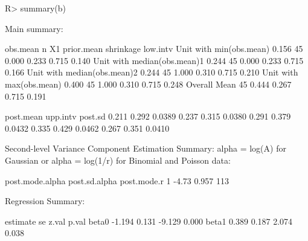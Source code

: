 \documentclass[article]{jss}
\begin{document}

\begin{CodeChunk}
\begin{CodeInput}
R> summary(b)
\end{CodeInput}
\begin{CodeOutput}
Main summary:

                            obs.mean  n    X1 prior.mean shrinkage low.intv 
Unit with min(obs.mean)        0.156 45 0.000      0.233     0.715    0.140     
Unit with median(obs.mean)1    0.244 45 0.000      0.233     0.715    0.166     
Unit with median(obs.mean)2    0.244 45 1.000      0.310     0.715    0.210     
Unit with max(obs.mean)        0.400 45 1.000      0.310     0.715    0.248     
Overall Mean                         45 0.444      0.267     0.715    0.191     


                            post.mean upp.intv post.sd
                                0.211    0.292  0.0389
                                0.237    0.315  0.0380
                                0.291    0.379  0.0432
                                0.335    0.429  0.0462
                                0.267    0.351  0.0410

Second-level Variance Component Estimation Summary:
alpha = log(A) for Gaussian or alpha =  log(1/r) for Binomial and Poisson data:

  post.mode.alpha post.sd.alpha post.mode.r
1           -4.73         0.957         113


Regression Summary:

      estimate    se  z.val p.val
beta0   -1.194 0.131 -9.129 0.000
beta1    0.389 0.187  2.074 0.038
\end{CodeOutput}
\end{CodeChunk}
\end{document}
